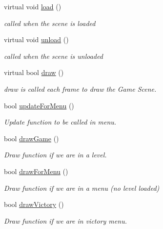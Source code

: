 \begin{DoxyCompactItemize}
\mbox{\label{class_scene_game_ad10061001f5b8518452f61f1edd79fff}} 
virtual void \hyperlink{class_scene_game_ad10061001f5b8518452f61f1edd79fff}{load} ()
\begin{DoxyCompactList}\small\item\em called when the scene is loaded \end{DoxyCompactList}\item 
\mbox{\label{class_scene_game_abca28f01a7f00a09da5e6f9ede80e3f0}} 
virtual void \hyperlink{class_scene_game_abca28f01a7f00a09da5e6f9ede80e3f0}{unload} ()
\begin{DoxyCompactList}\small\item\em called when the scene is unloaded \end{DoxyCompactList}\item 
virtual bool \hyperlink{class_scene_game_a0797fee2de442f68aef19cc5c3299ec3}{draw} ()
\begin{DoxyCompactList}\small\item\em draw is called each frame to draw the Game Scene. \end{DoxyCompactList}\item 
bool \hyperlink{class_scene_game_a31f15b71525e919299f3d410e01a6b51}{update\+For\+Menu} ()
\begin{DoxyCompactList}\small\item\em Update function to be called in menu. \end{DoxyCompactList}\item 
bool \hyperlink{class_scene_game_aa5a77510343519b344cda44acc320bcb}{draw\+Game} ()
\begin{DoxyCompactList}\small\item\em Draw function if we are in a level. \end{DoxyCompactList}\item 
bool \hyperlink{class_scene_game_acf0d5bdff0bc5393f284ae9dc4898152}{draw\+For\+Menu} ()
\begin{DoxyCompactList}\small\item\em Draw function if we are in a menu (no level loaded) \end{DoxyCompactList}\item 
bool \hyperlink{class_scene_game_a4465a247855d6ce62717bad15f9058c8}{draw\+Victory} ()
\begin{DoxyCompactList}\small\item\em Draw function if we are in victory menu. \end{DoxyCompactList}\item 

\end{DoxyCompactItemize}
